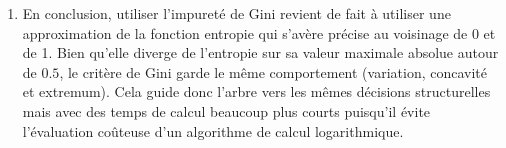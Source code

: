 \documentclass[solutions]{../exercices}
\begin{document}
\begin{solution}
\begin{enumerate}
\begin{equation*}
    \end{equation*}
    C'est ce qui justifie la convention utilisée de poser $0 \ln 0 = 0$.
    \item En conclusion, utiliser l'impureté de Gini revient de fait à utiliser une approximation de la fonction entropie qui s'avère précise au voisinage de 0 et de 1. Bien qu'elle diverge de l'entropie sur sa valeur maximale absolue autour de $0.5$, le critère de Gini garde le même comportement (variation, concavité et extremum). Cela guide donc l'arbre vers les mêmes décisions structurelles mais avec des temps de calcul beaucoup plus courts puisqu'il évite l'évaluation coûteuse d'un algorithme de calcul logarithmique.
\end{enumerate}
\end{solution}
\end{document}
